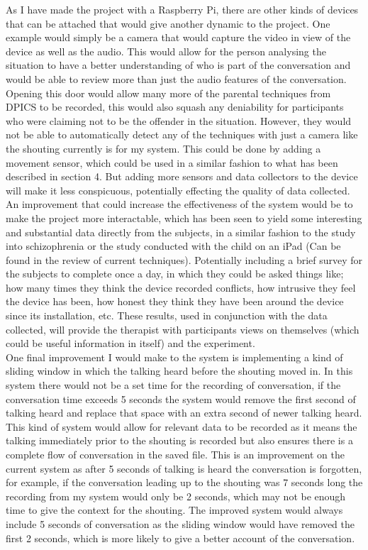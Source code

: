 \documentclass[a4paper,11pt]{report}
\begin{document}
As I have made the project with a Raspberry Pi, there are other kinds of devices that can be attached that would give another dynamic to the project. One example would simply be a camera that would capture the video in view of the device as well as the audio. This would allow for the person analysing the situation to have a better understanding of who is part of the conversation and would be able to review more than just the audio features of the conversation. Opening this door would allow many more of the parental techniques from DPICS to be recorded, this would also squash any deniability for participants who were claiming not to be the offender in the situation. However, they would not be able to automatically detect any of the techniques with just a camera like the shouting currently is for my system. This could be done by adding a movement sensor, which could be used in a similar fashion to what has been described in section 4. But adding more sensors and data collectors to the device will make it less conspicuous, potentially effecting the quality of data collected.\\
  
An improvement that could increase the effectiveness of the system would be to make the project more interactable, which has been seen to yield some interesting and substantial data directly from the subjects, in a similar fashion to the study into schizophrenia or the study conducted with the child on an iPad (Can be found in the review of current techniques). Potentially including a brief survey for the subjects to complete once a day, in which they could be asked things like; how many times they think the device recorded conflicts, how intrusive they feel the device has been, how honest they think they have been around the device since its installation, etc. These results, used in conjunction with the data collected, will provide the therapist with participants views on themselves (which could be useful information in itself) and the experiment.\\

One final improvement I would make to the system is implementing a kind of sliding window in which the talking heard before the shouting moved in. In this system there would not be a set time for the recording of conversation, if the conversation time exceeds 5 seconds the system would remove the first second of talking heard and replace that space with an extra second of newer talking heard. This kind of system would allow for relevant data to be recorded as it means the talking immediately prior to the shouting is recorded but also ensures there is a complete flow of conversation in the saved file. This is an improvement on the current system as after 5 seconds of talking is heard the conversation is forgotten, for example, if the conversation leading up to the shouting was 7 seconds long the recording from my system would only be 2 seconds, which may not be enough time to give the context for the shouting. The improved system would always include 5 seconds of conversation as the sliding window would have removed the first 2 seconds, which is more likely to give a better account of the conversation.
\end{document}
